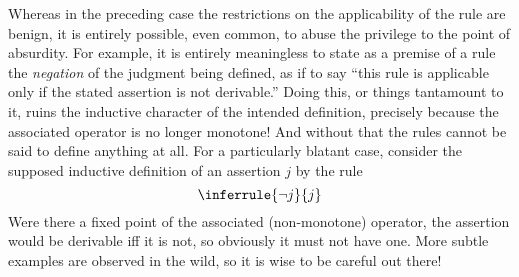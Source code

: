 \documentclass[11pt,twoside]{article}
\begin{document}
Whereas in the preceding case the restrictions on the applicability of the rule are
benign, it is entirely possible, even common, to abuse the privilege to the point of
absurdity.  For example, it is entirely meaningless to state as a premise of a rule the
\emph{negation} of the judgment being defined, as if to say ``this rule is applicable only
if the stated assertion is not derivable.''  Doing this, or things tantamount to it, ruins
the inductive character of the intended definition, precisely because the associated
operator is no longer monotone!  And without that the rules cannot be said to define
anything at all.  For a particularly blatant case, consider the supposed inductive
definition of an assertion $j$ by the rule
\begin{displaymath}
  \inferrule
  {\neg j}
  {j}
\end{displaymath}
Were there a fixed point of the associated (non-monotone) operator, the assertion would be
derivable iff it is not, so obviously it must not have one.  More subtle examples are
observed in the wild, so it is wise to be careful out there!

\nocite{davey-priestley}



\end{document}
